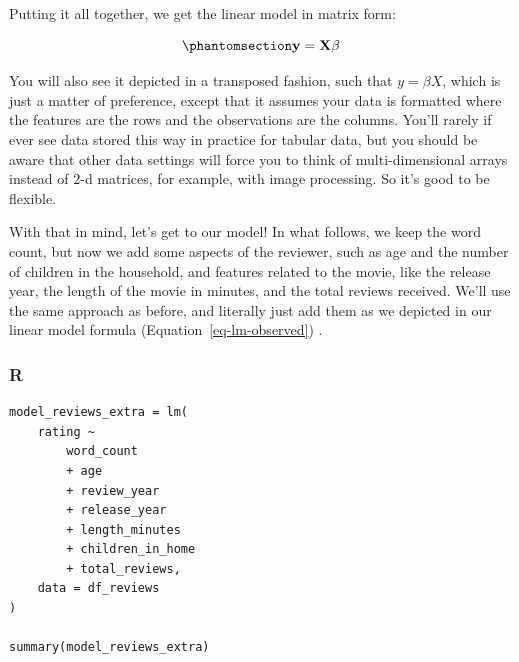 \documentclass[
  letterpaper,
]{krantz}
\begin{document}
\begin{tcolorbox}[enhanced jigsaw, colframe=quarto-callout-note-color-frame, opacityback=0, breakable, left=2mm, rightrule=.15mm, toprule=.15mm, arc=.35mm, leftrule=.75mm, colback=white, bottomrule=.15mm]
Putting it all together, we get the linear model in matrix form:

\begin{equation}\phantomsection\label{eq-lm-mat-mult}{
\bf{y = X\beta }
}\end{equation}

You will also see it depicted in a transposed fashion, such that
\(y = \beta X\), which is just a matter of preference, except that it
assumes your data is formatted where the features are the rows and the
observations are the columns. You'll rarely if ever see data stored this
way in practice for tabular data, but you should be aware that other
data settings will force you to think of multi-dimensional
arrays\footnotemark{} instead of 2-d matrices, for example, with image
processing. So it's good to be flexible.

\end{tcolorbox}


With that in mind, let's get to our model! In what follows, we keep the
word count, but now we add some aspects of the reviewer, such as age and
the number of children in the household, and features related to the
movie, like the release year, the length of the movie in minutes, and
the total reviews received. We'll use the same approach as before, and
literally just add them as we depicted in our linear model formula
(Equation~\ref{eq-lm-observed}) .

\subsubsection{R}

\begin{verbatim}
model_reviews_extra = lm(
    rating ~
        word_count
        + age
        + review_year
        + release_year
        + length_minutes
        + children_in_home
        + total_reviews,
    data = df_reviews
)

summary(model_reviews_extra)
\end{verbatim}
\end{document}
